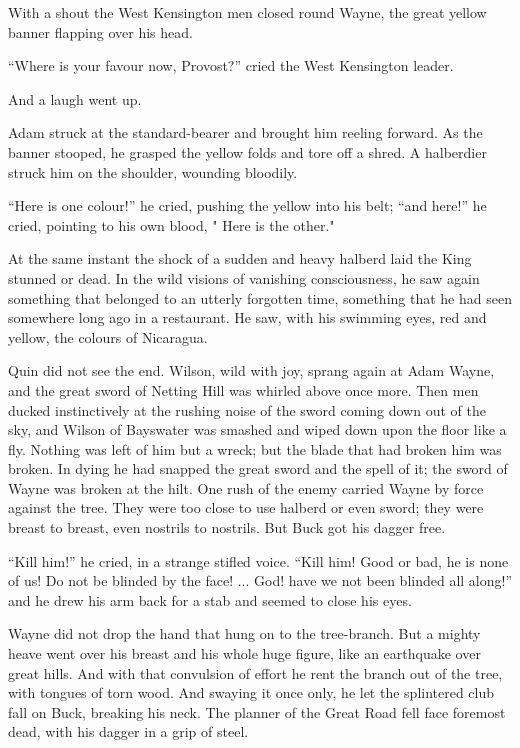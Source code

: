 \documentclass{book}
\begin{document}
With a shout the West Kensington men closed round Wayne, the great yellow banner flapping over his head.

“Where is your favour now, Provost?” cried the West Kensington leader.

And a laugh went up.

Adam struck at the standard-bearer and brought him reeling forward. As the banner stooped, he grasped the yellow folds and tore off a shred. A halberdier struck him on the shoulder, wounding bloodily.

“Here is one colour!” he cried, pushing the yellow into his belt; “and here!” he cried, pointing to his own blood, " Here is the other."

At the same instant the shock of a sudden and heavy halberd laid the King stunned or dead. In the wild visions of vanishing consciousness, he saw again something that belonged to an utterly forgotten time, something that he had seen somewhere long ago in a restaurant. He saw, with his swimming eyes, red and yellow, the colours of Nicaragua.

Quin did not see the end. Wilson, wild with joy, sprang again at Adam Wayne, and the great sword of Netting Hill was whirled above once more. Then men ducked instinctively at the rushing noise of the sword coming down out of the sky, and Wilson of Bayswater was smashed and wiped down upon the floor like a fly. Nothing was left of him but a wreck; but the blade that had broken him was broken. In dying he had snapped the great sword and the spell of it; the sword of Wayne was broken at the hilt. One rush of the enemy carried Wayne by force against the tree. They were too close to use halberd or even sword; they were breast to breast, even nostrils to nostrils. But Buck got his dagger free.

“Kill him!” he cried, in a strange stifled voice. “Kill him! Good or bad, he is none of us! Do not be blinded by the face! ... God! have we not been blinded all along!” and he drew his arm back for a stab and seemed to close his eyes.

Wayne did not drop the hand that hung on to the tree-branch. But a mighty heave went over his breast and his whole huge figure, like an earthquake over great hills. And with that convulsion of effort he rent the branch out of the tree, with tongues of torn wood. And swaying it once only, he let the splintered club fall on Buck, breaking his neck. The planner of the Great Road fell face foremost dead, with his dagger in a grip of steel.
\end{document}
